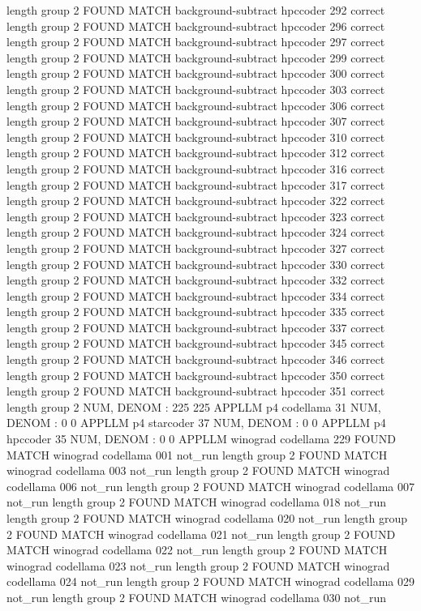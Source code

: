 length group  2
FOUND MATCH background-subtract hpccoder 292 correct
length group  2
FOUND MATCH background-subtract hpccoder 296 correct
length group  2
FOUND MATCH background-subtract hpccoder 297 correct
length group  2
FOUND MATCH background-subtract hpccoder 299 correct
length group  2
FOUND MATCH background-subtract hpccoder 300 correct
length group  2
FOUND MATCH background-subtract hpccoder 303 correct
length group  2
FOUND MATCH background-subtract hpccoder 306 correct
length group  2
FOUND MATCH background-subtract hpccoder 307 correct
length group  2
FOUND MATCH background-subtract hpccoder 310 correct
length group  2
FOUND MATCH background-subtract hpccoder 312 correct
length group  2
FOUND MATCH background-subtract hpccoder 316 correct
length group  2
FOUND MATCH background-subtract hpccoder 317 correct
length group  2
FOUND MATCH background-subtract hpccoder 322 correct
length group  2
FOUND MATCH background-subtract hpccoder 323 correct
length group  2
FOUND MATCH background-subtract hpccoder 324 correct
length group  2
FOUND MATCH background-subtract hpccoder 327 correct
length group  2
FOUND MATCH background-subtract hpccoder 330 correct
length group  2
FOUND MATCH background-subtract hpccoder 332 correct
length group  2
FOUND MATCH background-subtract hpccoder 334 correct
length group  2
FOUND MATCH background-subtract hpccoder 335 correct
length group  2
FOUND MATCH background-subtract hpccoder 337 correct
length group  2
FOUND MATCH background-subtract hpccoder 345 correct
length group  2
FOUND MATCH background-subtract hpccoder 346 correct
length group  2
FOUND MATCH background-subtract hpccoder 350 correct
length group  2
FOUND MATCH background-subtract hpccoder 351 correct
length group  2
NUM, DENOM : 225 225
APPLLM p4 codellama
31
NUM, DENOM : 0 0
APPLLM p4 starcoder
37
NUM, DENOM : 0 0
APPLLM p4 hpccoder
35
NUM, DENOM : 0 0
APPLLM winograd codellama
229
FOUND MATCH winograd codellama 001 not_run
length group  2
FOUND MATCH winograd codellama 003 not_run
length group  2
FOUND MATCH winograd codellama 006 not_run
length group  2
FOUND MATCH winograd codellama 007 not_run
length group  2
FOUND MATCH winograd codellama 018 not_run
length group  2
FOUND MATCH winograd codellama 020 not_run
length group  2
FOUND MATCH winograd codellama 021 not_run
length group  2
FOUND MATCH winograd codellama 022 not_run
length group  2
FOUND MATCH winograd codellama 023 not_run
length group  2
FOUND MATCH winograd codellama 024 not_run
length group  2
FOUND MATCH winograd codellama 029 not_run
length group  2
FOUND MATCH winograd codellama 030 not_run
